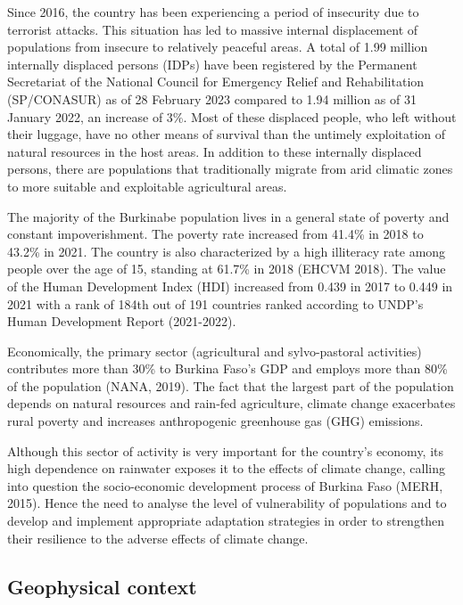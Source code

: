 \documentclass[
]{book}
\begin{document}
Since 2016, the country has been experiencing a period of insecurity due to terrorist attacks. This situation has led to massive internal displacement of populations from insecure to relatively peaceful areas. A total of 1.99 million internally displaced persons (IDPs) have been registered by the Permanent Secretariat of the National Council for Emergency Relief and Rehabilitation (SP/CONASUR) as of 28 February 2023 compared to 1.94 million as of 31 January 2022, an increase of 3\%. Most of these displaced people, who left without their luggage, have no other means of survival than the untimely exploitation of natural resources in the host areas. In addition to these internally displaced persons, there are populations that traditionally migrate from arid climatic zones to more suitable and exploitable agricultural areas.

The majority of the Burkinabe population lives in a general state of poverty and constant impoverishment. The poverty rate increased from 41.4\% in 2018 to 43.2\% in 2021. The country is also characterized by a high illiteracy rate among people over the age of 15, standing at 61.7\% in 2018 (EHCVM 2018). The value of the Human Development Index (HDI) increased from 0.439 in 2017 to 0.449 in 2021 with a rank of 184th out of 191 countries ranked according to UNDP's Human Development Report (2021-2022).

Economically, the primary sector (agricultural and sylvo-pastoral activities) contributes more than 30\% to Burkina Faso's GDP and employs more than 80\% of the population (NANA, 2019). The fact that the largest part of the population depends on natural resources and rain-fed agriculture, climate change exacerbates rural poverty and increases anthropogenic greenhouse gas (GHG) emissions.

Although this sector of activity is very important for the country's economy, its high dependence on rainwater exposes it to the effects of climate change, calling into question the socio-economic development process of Burkina Faso (MERH, 2015). Hence the need to analyse the level of vulnerability of populations and to develop and implement appropriate adaptation strategies in order to strengthen their resilience to the adverse effects of climate change.

\subsection{Geophysical context}\label{geophysical-context}
\end{document}
